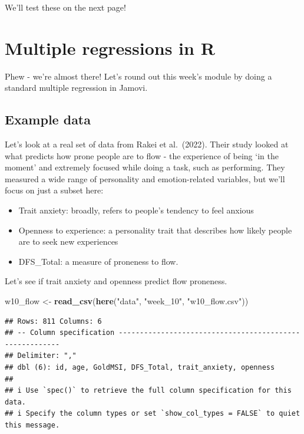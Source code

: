 \documentclass[
]{book}
\newenvironment{Shaded}{\begin{snugshade}}{\end{snugshade}}
\newcommand{\FunctionTok}[1]{\textcolor[rgb]{0.13,0.29,0.53}{\textbf{#1}}}
\newcommand{\NormalTok}[1]{#1}
\newcommand{\OtherTok}[1]{\textcolor[rgb]{0.56,0.35,0.01}{#1}}
\newcommand{\StringTok}[1]{\textcolor[rgb]{0.31,0.60,0.02}{#1}}
\providecommand{\tightlist}{%
  \setlength{\itemsep}{0pt}\setlength{\parskip}{0pt}}
\begin{document}
We'll test these on the next page!

\hypertarget{multreg-intro}{%
\section{Multiple regressions in R}\label{multreg-intro}}

Phew - we're almost there! Let's round out this week's module by doing a standard multiple regression in Jamovi.

\hypertarget{example-data-5}{%
\subsection{Example data}\label{example-data-5}}

Let's look at a real set of data from Rakei et al.~(2022). Their study looked at what predicts how prone people are to flow - the experience of being `in the moment' and extremely focused while doing a task, such as performing. They measured a wide range of personality and emotion-related variables, but we'll focus on just a subset here:

\begin{itemize}
\tightlist
\item
  Trait anxiety: broadly, refers to people's tendency to feel anxious
\item
  Openness to experience: a personality trait that describes how likely people are to seek new experiences
\item
  DFS\_Total: a measure of proneness to flow.
\end{itemize}

Let's see if trait anxiety and openness predict flow proneness.

\begin{Shaded}
\begin{Highlighting}[]
\NormalTok{w10\_flow }\OtherTok{\textless{}{-}} \FunctionTok{read\_csv}\NormalTok{(}\FunctionTok{here}\NormalTok{(}\StringTok{"data"}\NormalTok{, }\StringTok{"week\_10"}\NormalTok{, }\StringTok{"w10\_flow.csv"}\NormalTok{))}
\end{Highlighting}
\end{Shaded}

\begin{verbatim}
## Rows: 811 Columns: 6
## -- Column specification --------------------------------------------------------
## Delimiter: ","
## dbl (6): id, age, GoldMSI, DFS_Total, trait_anxiety, openness
## 
## i Use `spec()` to retrieve the full column specification for this data.
## i Specify the column types or set `show_col_types = FALSE` to quiet this message.
\end{verbatim}
\end{document}
